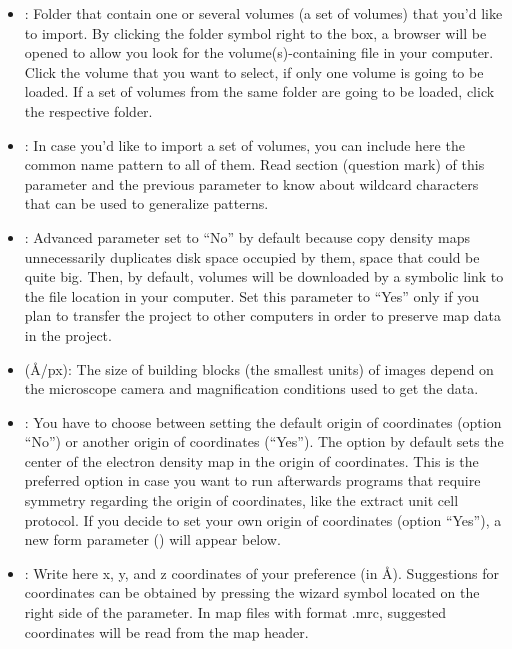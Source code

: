 \begin{itemize}
\begin{itemize}
  \begin{itemize}
   \item {}: Folder that contain one or several volumes (a set of volumes) that you'd like to import. By clicking the folder symbol right to the  box, a browser will be opened to allow you look for the volume(s)-containing file in your computer. Click the volume that you want to select, if only one volume is going to be loaded. If a set of volumes from the same folder are going to be loaded, click the respective folder.
   \item {}: In case you'd like to import a set of volumes, you can include here the common name pattern to all of them. Read  section (question mark) of this parameter and the previous parameter  to know about wildcard characters that can be used to generalize patterns.
   \item {}: Advanced parameter set to ``No'' by default because copy density maps unnecessarily duplicates disk space occupied by them, space that could be quite big. Then, by default, volumes will be downloaded by a symbolic link to the file location in your computer. Set this parameter to ``Yes'' only if you plan to transfer the project to other computers in order to preserve map data in the \scipion project.
   \item {} (\AA/px): The size of building blocks (the smallest units) of images depend on the microscope camera and magnification conditions used to get the data.
   \item {}: You have to choose between setting the default origin of coordinates (option ``No'') or another origin of coordinates (``Yes''). The option by default sets the center of the electron density map in the origin of coordinates. This is the preferred option in case you want to run afterwards programs that require symmetry regarding the origin of coordinates, like the extract unit cell protocol. If you decide to set your own origin of coordinates (option ``Yes''), a new form parameter () will appear below.
   \item {}: Write here x, y, and z coordinates of your preference (in \AA). Suggestions for coordinates can be obtained by pressing the wizard symbol located on the right side of the  parameter. In map files with format .mrc, suggested coordinates will be read from the map header.
   \end{itemize}
   

\end{itemize}
\end{itemize}
